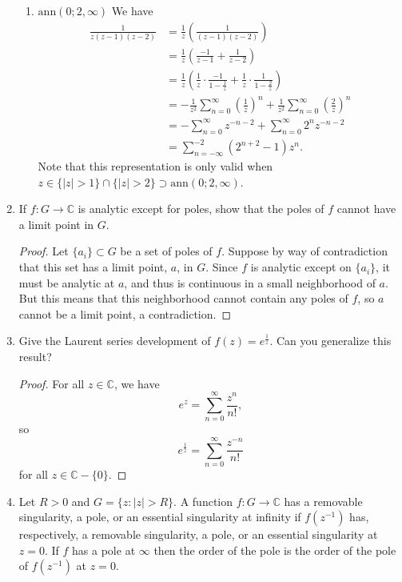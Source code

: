 \documentclass[11pt,oneside,english]{amsart}
\theoremstyle{definition}
\newcommand{\MB}[1]{\mathbb{#1}}
\begin{document}
\begin{enumerate}
\begin{enumerate}
\item $\text{ann}(0;2,\infty)$
We have
\begin{align*}
\frac{1}{z(z-1)(z-2)}&=\frac{1}{z}\left(\frac{1}{(z-1)(z-2)}\right)\\[2mm]
&=\frac{1}{z}\left(\frac{-1}{z-1}+\frac{1}{z-2}\right)\\[2mm]
&=\frac{1}{z}\left(\frac{1}{z}\cdot\frac{-1}{1-\frac{1}{z}}+\frac{1}{z}\cdot\frac{1}{1-\frac{2}{z}}\right)\\[2mm]
&=-\frac{1}{z^2}\sum_{n=0}^\infty \left(\frac{1}{z}\right)^n+\frac{1}{z^2}\sum_{n=0}^\infty \left(\frac{2}{z}\right)^n\\[2mm]
&=-\sum_{n=0}^\infty z^{-n-2}+\sum_{n=0}^\infty 2^nz^{-n-2}\\[2mm]
&=\sum_{n=-\infty}^{-2}\left(2^{n+2}-1\right)z^n.
\end{align*}
Note that this representation is only valid when $z\in\{|z|>1\}\cap\{|z|>2\}\supset\text{ann}(0;2,\infty)$.
\end{enumerate}

\setcounter{enumi}{5}

\item If $f:G\to\MB{C}$ is analytic except for poles, show that the poles of $f$ cannot have a limit point in $G$.

\begin{proof}
Let $\{a_i\}\subset G$ be a set of poles of $f$. Suppose by way of contradiction that this set has a limit point, $a$, in $G$. Since $f$ is analytic except on $\{a_i\}$, it must be analytic at $a$, and thus is continuous in a small neighborhood of $a$. But this means that this neighborhood cannot contain any poles of $f$, so $a$ cannot be a limit point, a contradiction.
\end{proof}


\setcounter{enumi}{10}

\item Give the Laurent series development of $f(z)=e^{\frac{1}{z}}$. Can you generalize this result?

\begin{proof}
For all $z\in\MB{C}$, we have
\[
e^z=\sum_{n=0}^\infty \frac{z^n}{n!},
\]
so
\[
e^{\frac{1}{z}}=\sum_{n=0}^\infty \frac{z^{-n}}{n!}
\]
for all $z\in\MB{C}-\{0\}$.
\end{proof}


\setcounter{enumi}{12}

\item Let $R>0$ and $G=\{z:|z|>R\}$. A function $f:G\to\MB{C}$ has a removable singularity, a pole, or an essential singularity at infinity if $f(z^{-1})$ has, respectively, a removable singularity, a pole, or an essential singularity at $z=0$. If $f$ has a pole at $\infty$ then the order of the pole is the order of the pole of $f(z^{-1})$ at $z=0$.


\end{enumerate}
\end{document}
